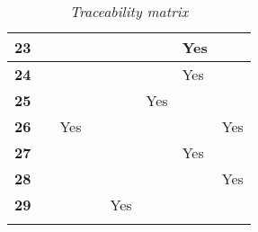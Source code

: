 \documentclass[../RASD.tex]{subfiles}
\begin{document}
\begin{longtable}{| p{.02\linewidth} | p{.10\linewidth} | p{.14\linewidth} | p{.14\linewidth} | p{.105\linewidth} | p{.14\linewidth} |
        p{.17\linewidth} | p{.12\linewidth} |}
            \textbf{23} & & & & & & Yes & \\ \hline
            \textbf{24} & & & & & & Yes & \\ \hline
            \textbf{25} & & & & & Yes & & \\ \hline
            \textbf{26} & & Yes & & & & & Yes \\ \hline
            \textbf{27} & & & & & & Yes & \\ \hline
            \textbf{28} & & & & & & & Yes\\ \hline
            \textbf{29} & & & & Yes & & & \\ \hline
            \caption[\textit{Traceability matrix}]{\textit{Traceability matrix}}
        \end{longtable}
\end{document}
